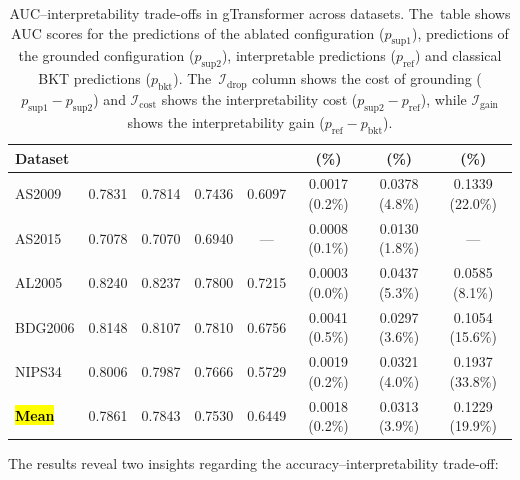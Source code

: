 \documentclass[applsci,article,accept,moreauthors,pdftex]{Definitions/mdpi}
\begin{document}
\begin{table}[H]
\centering
\small
\caption{AUC--interpretability trade-offs in gTransformer across datasets. The~table shows AUC scores for the predictions of the ablated configuration ($p_{\text{sup}1}$), predictions of the grounded configuration ($p_{\text{sup}2}$), interpretable predictions ($p_{\text{ref}}$) and classical BKT predictions ($p_{\text{bkt}}$). The~$\mathcal{I}_{\text{drop}}$ column shows the cost of grounding ($p_{\text{sup}1} - p_{\text{sup}2}$) and $\mathcal{I}_{\text{cost}}$ shows the interpretability cost ($p_{\text{sup}2} - p_{\text{ref}}$), while $\mathcal{I}_{\text{gain}}$ shows the interpretability gain ($p_{\text{ref}} - p_{\text{bkt}}$).}
\label{tab:tradeoff}
\begin{tabularx}{\textwidth}{LcCccccc}
\toprule
\textbf{Dataset} &  &  &  &  &  \textbf{(\%)} &  \textbf{(\%)} &  \textbf{(\%)} \\
\midrule
AS2009 & 0.7831 & 0.7814 & 0.7436 & 0.6097 & 0.0017 (0.2\%) & 0.0378 (4.8\%) & 0.1339 (22.0\%) \\
AS2015 & 0.7078 & 0.7070 & 0.6940 & --- & 0.0008 (0.1\%) & 0.0130 (1.8\%) & --- \\
AL2005 & 0.8240 & 0.8237 & 0.7800 & 0.7215 & 0.0003 (0.0\%) & 0.0437 (5.3\%) & 0.0585 (8.1\%) \\
BDG2006 & 0.8148 & 0.8107 & 0.7810 & 0.6756 & 0.0041 (0.5\%) & 0.0297 (3.6\%) & 0.1054 (15.6\%) \\
NIPS34 & 0.8006 & 0.7987 & 0.7666 & 0.5729 & 0.0019 (0.2\%) & 0.0321 (4.0\%) & 0.1937 (33.8\%) \\
\midrule
\textbf{\hl{Mean}%
} & 0.7861 & 0.7843 & 0.7530 & 0.6449 & 0.0018 (0.2\%) & 0.0313 (3.9\%) & 0.1229 (19.9\%) \\
\bottomrule
\end{tabularx}
\end{table}


The results reveal two insights regarding the accuracy--interpretability trade-off:
\end{document}
